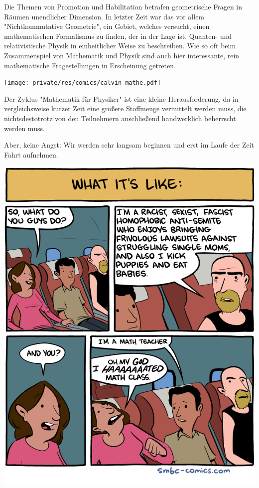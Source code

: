 \begin{multicols}{2}
Die Themen von Promotion und Habilitation betrafen geometrische Fragen in Räumen unendlicher Dimension.
In letzter Zeit war das vor allem "Nichtkommutative Geometrie", ein Gebiet, welches versucht, einen mathematischen Formalismus zu finden, der in der Lage ist, Quanten- und relativistische Physik in einheitlicher Weise zu beschreiben.
Wie so oft beim Zusammenspiel von Mathematik und Physik sind auch hier interessante, rein mathematische Fragestellungen in Erscheinung getreten.

\begin{center}
	\texttt{[image: private/res/comics/calvin\_mathe.pdf]}
\end{center}

Der Zyklus "Mathematik für Physiker" ist eine kleine Herausforderung, da in vergleichsweise kurzer Zeit eine größere Stoffmenge vermittelt werden muss, die nichtsdestotrotz von den Teilnehmern anschließend handwerklich beherrscht werden muss.

Aber, keine Angst: Wir werden sehr langsam beginnen und erst im Laufe der Zeit Fahrt aufnehmen.

\begin{center}
	\includegraphics[width=\columnwidth, height=0.32\textheight]{res/smbc/2016-06-19_what-its-like.png}
\end{center}
\end{multicols}

